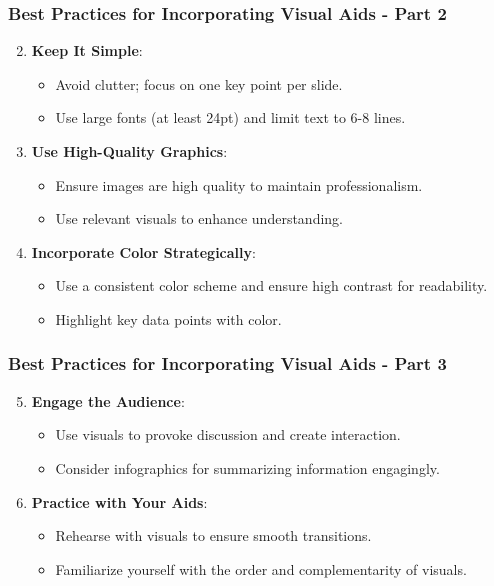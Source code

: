 \documentclass[aspectratio=169]{beamer}
\begin{document}
\begin{frame}[fragile]
    \frametitle{Best Practices for Incorporating Visual Aids - Part 2}
    \begin{enumerate}
        \setcounter{enumi}{1}
        \item \textbf{Keep It Simple}:
            \begin{itemize}
                \item Avoid clutter; focus on one key point per slide.
                \item Use large fonts (at least 24pt) and limit text to 6-8 lines.
            \end{itemize}

        \item \textbf{Use High-Quality Graphics}:
            \begin{itemize}
                \item Ensure images are high quality to maintain professionalism.
                \item Use relevant visuals to enhance understanding.
            \end{itemize}

        \item \textbf{Incorporate Color Strategically}:
            \begin{itemize}
                \item Use a consistent color scheme and ensure high contrast for readability.
                \item Highlight key data points with color.
            \end{itemize}
    \end{enumerate}
\end{frame}

\begin{frame}[fragile]
    \frametitle{Best Practices for Incorporating Visual Aids - Part 3}
    \begin{enumerate}
        \setcounter{enumi}{4}
        \item \textbf{Engage the Audience}:
            \begin{itemize}
                \item Use visuals to provoke discussion and create interaction.
                \item Consider infographics for summarizing information engagingly.
            \end{itemize}

        \item \textbf{Practice with Your Aids}:
            \begin{itemize}
                \item Rehearse with visuals to ensure smooth transitions.
                \item Familiarize yourself with the order and complementarity of visuals.
            \end{itemize}
    \end{enumerate}
\end{frame}
\end{document}

